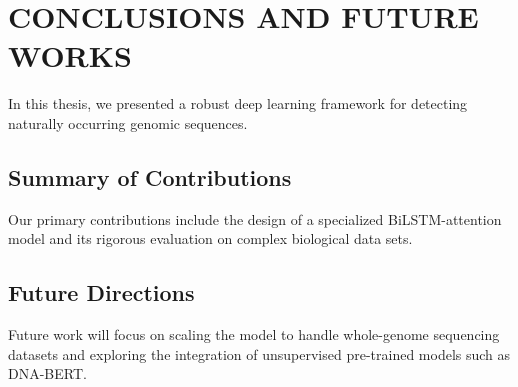 \chapter{CONCLUSIONS AND FUTURE WORKS}
\label{ch:conclusion}

In this thesis, we presented a robust deep learning framework for detecting naturally occurring genomic sequences. 

\section{Summary of Contributions}
Our primary contributions include the design of a specialized BiLSTM-attention model and its rigorous evaluation on complex biological data sets.

\section{Future Directions}
Future work will focus on scaling the model to handle whole-genome sequencing datasets and exploring the integration of unsupervised pre-trained models such as DNA-BERT.
